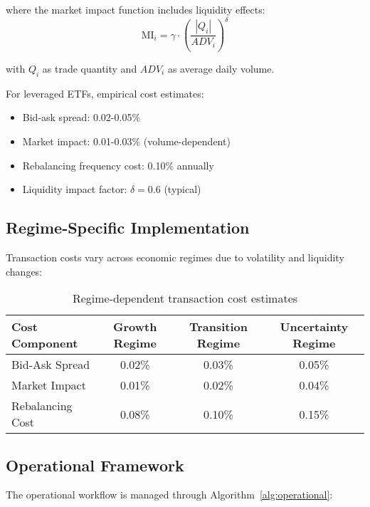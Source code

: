 \documentclass[onecolumn,ieee]{arithmaxresearch}
\begin{document}
where the market impact function includes liquidity effects:
\begin{equation}
\text{MI}_i = \gamma \cdot \left(\frac{|Q_i|}{ADV_i}\right)^\delta
\end{equation}

with $Q_i$ as trade quantity and $ADV_i$ as average daily volume.

For leveraged ETFs, empirical cost estimates:
\begin{itemize}
    \item Bid-ask spread: 0.02-0.05\%
    \item Market impact: 0.01-0.03\% (volume-dependent)
    \item Rebalancing frequency cost: 0.10\% annually
    \item Liquidity impact factor: $\delta = 0.6$ (typical)
\end{itemize}

\subsection{Regime-Specific Implementation}

Transaction costs vary across economic regimes due to volatility and liquidity changes:

\begin{table}[h]
\centering
\begin{tabular}{lccc}
\toprule
\textbf{Cost Component} & \textbf{Growth Regime} & \textbf{Transition Regime} & \textbf{Uncertainty Regime} \\
\midrule
Bid-Ask Spread & 0.02\% & 0.03\% & 0.05\% \\
Market Impact & 0.01\% & 0.02\% & 0.04\% \\
Rebalancing Cost & 0.08\% & 0.10\% & 0.15\% \\
\bottomrule
\end{tabular}
\caption{Regime-dependent transaction cost estimates}
\end{table}

\subsection{Operational Framework}

The operational workflow is managed through Algorithm~\ref{alg:operational}:
\end{document}
